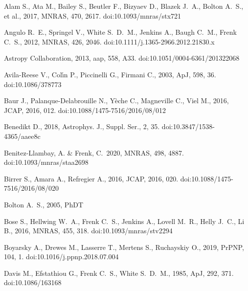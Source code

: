 \documentclass[a4paper, fleqn, usenatbib, useAMS]{mnras}
\def\mnras{MNRAS}
\begin{document}
\begin{thebibliography}{99}

 Alam S., Ata M., Bailey S., Beutler F., Bizyaev D., Blazek J.~A., Bolton A.~S., et al., 2017, MNRAS, 470, 2617. doi:10.1093/mnras/stx721

 Angulo R.~E., Springel V., White S.~D.~M., Jenkins A., Baugh C.~M., Frenk C.~S., 2012, MNRAS, 426, 2046. doi:10.1111/j.1365-2966.2012.21830.x

 Astropy Collaboration, 2013, aap, 558, A33. doi:10.1051/0004-6361/201322068

 Avila-Reese V., Col{\'\i}n P., Piccinelli G., Firmani C., 2003, ApJ, 598, 36. doi:10.1086/378773


 Baur J., Palanque-Delabrouille N., Y{\`e}che C., Magneville C., Viel M., 2016, JCAP, 2016, 012. doi:10.1088/1475-7516/2016/08/012

 Benedikt D., 2018, Astrophys. J., Suppl. Ser., 2, 35. doi:10.3847/1538-4365/aaee8c

  Benitez-Llambay, A. \& Frenk, C.\ 2020, \mnras, 498,
  4887. doi:10.1093/mnras/staa2698

 Birrer S., Amara A., Refregier A., 2016, JCAP, 2016, 020. doi:10.1088/1475-7516/2016/08/020

 Bolton A.~S., 2005, PhDT

 Bose S., Hellwing W.~A., Frenk C.~S., Jenkins A., Lovell M.~R., Helly J.~C., Li B., 2016, MNRAS, 455, 318. doi:10.1093/mnras/stv2294

 Boyarsky A., Drewes M., Lasserre T., Mertens S., Ruchayskiy O., 2019, PrPNP, 104, 1. doi:10.1016/j.ppnp.2018.07.004


 Davis M., Efstathiou G., Frenk C.~S., White S.~D.~M., 1985, ApJ, 292, 371. doi:10.1086/163168


\end{thebibliography}
\end{document}

